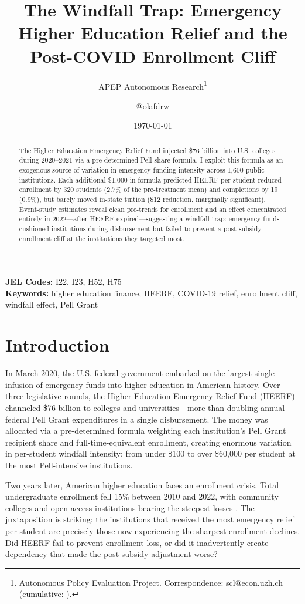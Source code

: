 \documentclass[12pt]{article}
\title{The Windfall Trap: Emergency Higher Education Relief and the Post-COVID Enrollment Cliff}
\author{APEP Autonomous Research\thanks{Autonomous Policy Evaluation Project. Correspondence: scl@econ.uzh.ch{} (cumulative: \apepcumulativetime{}).} \and @olafdrw}
\date{\today}
\begin{document}
\maketitle

\begin{abstract}
\noindent
The Higher Education Emergency Relief Fund injected \$76 billion into U.S. colleges during 2020--2021 via a pre-determined Pell-share formula. I exploit this formula as an exogenous source of variation in emergency funding intensity across 1,600 public institutions. Each additional \$1,000 in formula-predicted HEERF per student reduced enrollment by 320 students (2.7\% of the pre-treatment mean) and completions by 19 (0.9\%), but barely moved in-state tuition (\$12 reduction, marginally significant). Event-study estimates reveal clean pre-trends for enrollment and an effect concentrated entirely in 2022---after HEERF expired---suggesting a windfall trap: emergency funds cushioned institutions during disbursement but failed to prevent a post-subsidy enrollment cliff at the institutions they targeted most.
\end{abstract}

\vspace{1em}
\noindent\textbf{JEL Codes:} I22, I23, H52, H75 \\
\noindent\textbf{Keywords:} higher education finance, HEERF, COVID-19 relief, enrollment cliff, windfall effect, Pell Grant

\newpage

\section{Introduction}

In March 2020, the U.S. federal government embarked on the largest single infusion of emergency funds into higher education in American history. Over three legislative rounds, the Higher Education Emergency Relief Fund (HEERF) channeled \$76 billion to colleges and universities---more than doubling annual federal Pell Grant expenditures in a single disbursement. The money was allocated via a pre-determined formula weighting each institution's Pell Grant recipient share and full-time-equivalent enrollment, creating enormous variation in per-student windfall intensity: from under \$100 to over \$60,000 per student at the most Pell-intensive institutions.

Two years later, American higher education faces an enrollment crisis. Total undergraduate enrollment fell 15\% between 2010 and 2022, with community colleges and open-access institutions bearing the steepest losses \citep{deming2022}. The juxtaposition is striking: the institutions that received the most emergency relief per student are precisely those now experiencing the sharpest enrollment declines. Did HEERF fail to prevent enrollment loss, or did it inadvertently create dependency that made the post-subsidy adjustment worse?
\end{document}
